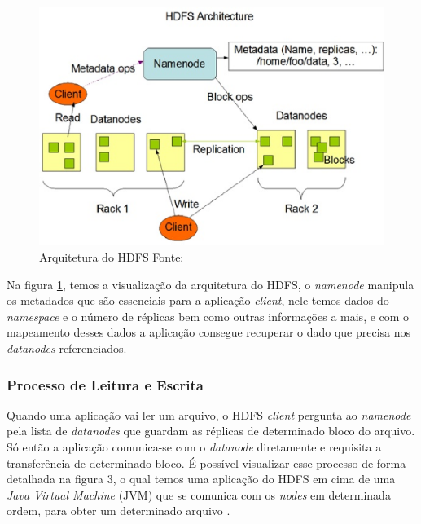                 \begin{figure}[ht!]
                    \centering
                    \includegraphics[keepaspectratio=true,scale=0.75]
                        {figuras/figura2.eps}
                    \caption[Arquitetura do HDFS]{Arquitetura do HDFS
                    \protect\linebreak Fonte: }
                    \label{figura2}
                \end{figure}

                Na figura \ref{figura2}, temos a visualização da arquitetura do HDFS, o \textit{namenode} manipula
                os metadados que são essenciais para a aplicação \textit{client}, nele temos dados do \textit{namespace}
                e o número de réplicas bem como outras informações a mais, e com o mapeamento desses dados a aplicação
                consegue recuperar o dado que precisa nos \textit{datanodes} referenciados.

            \subsubsection{Processo de Leitura e Escrita}

                Quando uma aplicação vai ler um arquivo, o HDFS \textit{client} pergunta ao \textit{namenode} pela lista
                de \textit{datanodes} que guardam as réplicas de determinado bloco do arquivo. Só então a aplicação
                comunica-se com o \textit{datanode} diretamente e requisita a transferência de determinado bloco. É
                possível visualizar esse processo de forma detalhada na figura 3, o qual temos uma aplicação do HDFS
                em cima de uma \textit{Java Virtual Machine} (JVM) que se comunica com os \textit{nodes} em determinada
                ordem, para obter um determinado arquivo \cite{shvachko2010}.

